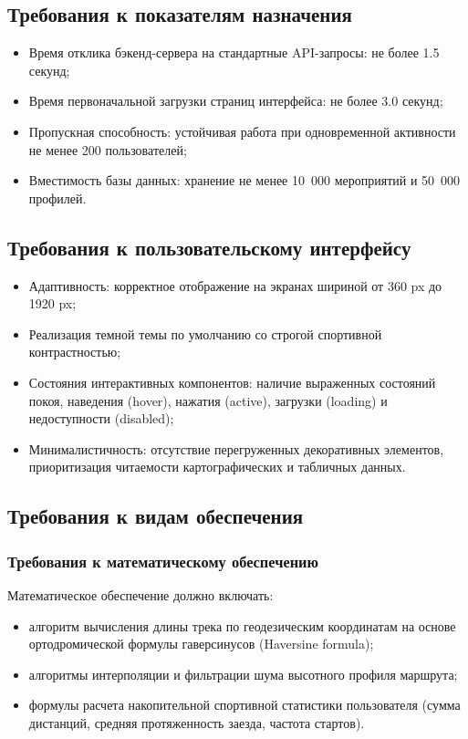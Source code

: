 \documentclass[a4paper,12pt]{article}
\begin{document}
\subsection{Требования к показателям назначения}
\begin{itemize}
	\item Время отклика бэкенд-сервера на стандартные API-запросы: не более 1.5 секунд;
	\item Время первоначальной загрузки страниц интерфейса: не более 3.0 секунд;
	\item Пропускная способность: устойчивая работа при одновременной активности не менее 200 пользователей;
	\item Вместимость базы данных: хранение не менее 10~000 мероприятий и 50~000 профилей.
\end{itemize}

\subsection{Требования к пользовательскому интерфейсу}
\begin{itemize}
	\item Адаптивность: корректное отображение на экранах шириной от 360 px до 1920 px;
	\item Реализация темной темы по умолчанию со строгой спортивной контрастностью;
	\item Состояния интерактивных компонентов: наличие выраженных состояний покоя, наведения (hover), нажатия (active), загрузки (loading) и недоступности (disabled);
	\item Минималистичность: отсутствие перегруженных декоративных элементов, приоритизация читаемости картографических и табличных данных.
\end{itemize}

\subsection{Требования к видам обеспечения}

\subsubsection{Требования к математическому обеспечению}
Математическое обеспечение должно включать:
\begin{itemize}
	\item алгоритм вычисления длины трека по геодезическим координатам на основе ортодромической формулы гаверсинусов (Haversine formula);
	\item алгоритмы интерполяции и фильтрации шума высотного профиля маршрута;
	\item формулы расчета накопительной спортивной статистики пользователя (сумма дистанций, средняя протяженность заезда, частота стартов).
\end{itemize}
\end{document}
